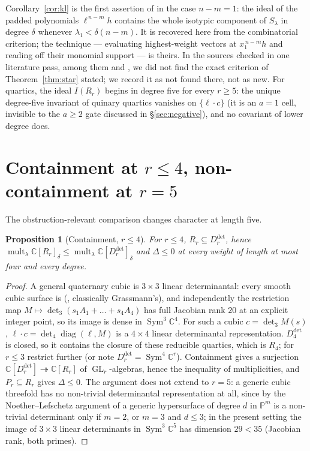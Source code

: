 \documentclass[11pt]{amsart}
\theoremstyle{plain}
\newtheorem{proposition}[theorem]{Proposition}
\theoremstyle{definition}
\theoremstyle{remark}
\DeclareMathOperator{\GL}{GL}
\DeclareMathOperator{\Sym}{Sym}
\DeclareMathOperator{\mult}{mult}
\newcommand{\bC}{\mathbb{C}}
\newcommand{\bP}{\mathbb{P}}
\newcommand{\Rr}{R}
\newcommand{\Pp}{P}
\newcommand{\Ddet}{D^{\det}}
\begin{document}
Corollary~\ref{cor:kl} is the first assertion of \cite[Thm.~1.3]{KL2} in the
case $n-m=1$: the ideal of the padded polynomials $\ell^{\,n-m}h$ contains the
whole isotypic component of $S_\lambda$ in degree $\delta$ whenever
$\lambda_1<\delta(n-m)$.  It is recovered here from the combinatorial
criterion; the technique --- evaluating highest-weight vectors at
$x_1^{\,n-m}h$ and reading off their monomial support --- is theirs.  In the
sources checked in one literature pass, among them \cite{KL2} and
\cite{Landsberg}, we did not find the exact criterion of
Theorem~\ref{thm:star} stated; we record it as not found there, not as new.  For quartics, the ideal
$I(\Rr_r)$ begins in degree five for every $r\ge5$: the unique degree-five
invariant of quinary quartics vanishes on $\{\ell\cdot c\}$ (it is an $a=1$
cell, invisible to the $a\ge2$ gate discussed in \S\ref{sec:negative}), and no
covariant of lower degree does.

\section{Containment at $r\le4$, non-containment at $r=5$}\label{sec:contain}

The obstruction-relevant comparison changes character at length five.

\begin{proposition}[Containment, $r\le4$]\label{prop:contain}
For $r\le4$, $\Rr_r\subseteq\Ddet_r$, hence
$\mult_\lambda\bC[\Rr_r]_\delta\le\mult_\lambda\bC[\Ddet_r]_\delta$ and
$\Delta\le0$ at every weight of length at most four and every degree.
\end{proposition}

\begin{proof}
A general quaternary cubic is $3\times3$ linear determinantal: every smooth
cubic surface is (\cite[Cor.~6.4]{Beau}, classically Grassmann's), and
independently the restriction map $M\mapsto\det_3(s_1A_1+\dots+s_4A_4)$ has
full Jacobian rank $20$ at an explicit integer point, so its image is dense in
$\Sym^{3}\bC^{4}$.  For such a cubic $c=\det_3M(s)$,
$\ell\cdot c=\det_4\operatorname{diag}(\ell,M)$ is a $4\times4$ linear
determinantal representation.  $\Ddet_4$ is closed, so it contains the closure
of these reducible quartics, which is $\Rr_4$; for $r\le3$ restrict further
(or note $\Ddet_r=\Sym^{4}\bC^{r}$).  Containment gives a surjection
$\bC[\Ddet_r]\twoheadrightarrow\bC[\Rr_r]$ of $\GL_r$-algebras, hence the
inequality of multiplicities, and $\Pp_r\subseteq\Rr_r$ gives $\Delta\le0$.
The argument does not extend to $r=5$: a generic cubic threefold has no
non-trivial determinantal representation at all, since by the
Noether--Lefschetz argument of \cite[(1.9)]{Beau} a generic hypersurface of
degree $d$ in $\bP^{m}$ is a non-trivial determinant only if $m=2$, or $m=3$
and $d\le3$; in the present setting the image of $3\times3$ linear
determinants in $\Sym^{3}\bC^{5}$ has dimension $29<35$ (Jacobian rank, both
primes).
\end{proof}
\end{document}
